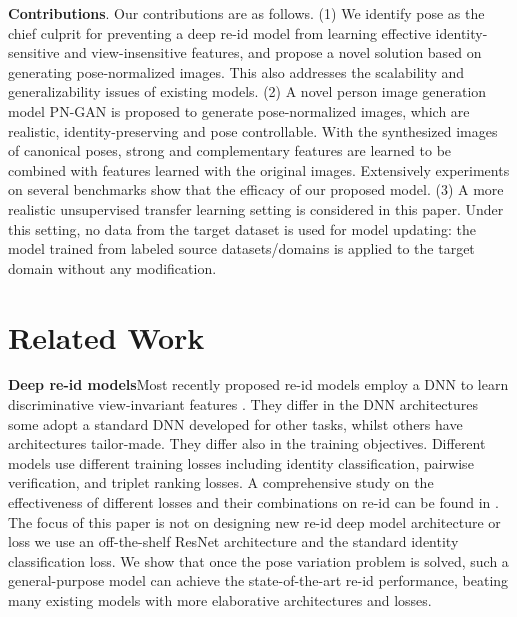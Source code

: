 \documentclass[10pt,letterpaper,twocolumn,10pt,letterpaper,twocolumn]{article}
\begin{document}
\noindent \textbf{Contributions}. Our contributions are as follows.
(1) We identify pose as the chief culprit for preventing a deep re-id
model from learning effective identity-sensitive and view-insensitive
features, and propose a novel solution based on generating pose-normalized
images. This also addresses the scalability and generalizability issues
of existing models. (2) A novel person image generation model PN-GAN
is proposed to generate pose-normalized images, which are realistic,
identity-preserving and pose controllable. With the synthesized images
of canonical poses, strong and complementary features are learned
to be combined with features learned with the original images. Extensively
experiments on several benchmarks show that the efficacy of our proposed
model. (3) A more realistic unsupervised transfer learning setting is considered
in this paper. Under this setting, no data from the target dataset
is used for model updating: the model trained from labeled source
datasets/domains is applied to the target domain without any modification.


\section{Related Work}

\noindent \textbf{Deep re-id models}\quad{}Most recently proposed
re-id models employ a DNN to learn discriminative view-invariant features
\cite{deepreid,Ejaz_cvpr2015,de_cheng_2016,yu2017cross,qian2017multi,SVDNet,reid_in_wild,PersonSearch}.
They differ in the DNN architectures \textendash{} some adopt a standard
DNN developed for other tasks, whilst others have architectures tailor-made.
They differ also in the training objectives. Different models use different
training losses including identity classification, pairwise verification,
and triplet ranking losses. A comprehensive study on the effectiveness
of different losses and their combinations on re-id can be found in
\cite{deeptransfer2016}. The focus of this paper is not on designing
new re-id deep model architecture or loss \textendash{} we use an
off-the-shelf ResNet architecture \cite{resnet} and the standard
identity classification loss. We show that once the pose variation
problem is solved, such a general-purpose model can achieve the state-of-the-art
re-id performance, beating many existing models with more elaborative
architectures and losses.
\end{document}
